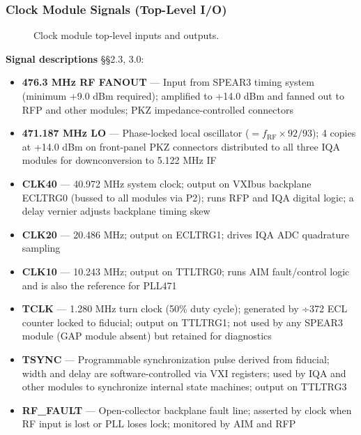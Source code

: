 \subsubsection{Clock Module Signals (Top-Level I/O)}

\begin{figure}[tbp]\centering
\begin{fitpicture}\end{fitpicture}
\caption{Clock module top-level inputs and outputs.}\label{fig:clock-io}
\end{figure}

\textbf{Signal descriptions}  §§2.3, 3.0:

\begin{itemize}
\tightlist
\item
  \textbf{476.3 MHz RF FANOUT} --- Input from SPEAR3 timing system (minimum +9.0 dBm required); amplified to +14.0 dBm and fanned out to RFP and other modules; PKZ impedance-controlled connectors
\item
  \textbf{471.187 MHz LO} --- Phase-locked local oscillator ($= f_\text{RF} \times 92/93$); 4 copies at +14.0 dBm on front-panel PKZ connectors distributed to all three IQA modules for downconversion to 5.122 MHz IF
\item
  \textbf{CLK40} --- 40.972 MHz system clock; output on VXIbus backplane ECLTRG0 (bussed to all modules via P2); runs RFP and IQA digital logic; a delay vernier adjusts backplane timing skew
\item
  \textbf{CLK20} --- 20.486 MHz; output on ECLTRG1; drives IQA ADC quadrature sampling
\item
  \textbf{CLK10} --- 10.243 MHz; output on TTLTRG0; runs AIM fault/control logic and is also the reference for PLL471
\item
  \textbf{TCLK} --- 1.280 MHz turn clock (50\% duty cycle); generated by ÷372 ECL counter locked to fiducial; output on TTLTRG1; not used by any SPEAR3 module (GAP module absent) but retained for diagnostics
\item
  \textbf{TSYNC} --- Programmable synchronization pulse derived from fiducial; width and delay are software-controlled via VXI registers; used by IQA and other modules to synchronize internal state machines; output on TTLTRG3
\item
  \textbf{RF\_FAULT} --- Open-collector backplane fault line; asserted by clock when RF input is lost or PLL loses lock; monitored by AIM and RFP
\end{itemize}

